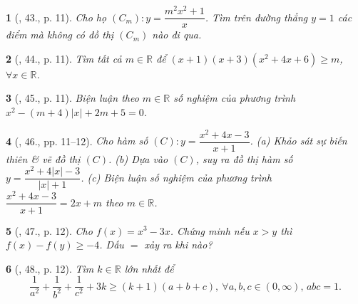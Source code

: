 \documentclass{article}
\newtheorem{baitoan}{}
\begin{document}
\begin{baitoan}[\cite{TLCT_BT_giai_tich_12}, 43., p. 11]
	Cho họ $(C_m):y = \dfrac{m^2x^2 + 1}{x}$. Tìm trên đường thẳng $y = 1$ các điểm mà không có đồ thị $(C_m)$ nào đi qua.
\end{baitoan}

\begin{baitoan}[\cite{TLCT_BT_giai_tich_12}, 44., p. 11]
	Tìm tất cả $m\in\mathbb{R}$ để $(x + 1)(x + 3)(x^2 + 4x + 6)\ge m$, $\forall x\in\mathbb{R}$.
\end{baitoan}

\begin{baitoan}[\cite{TLCT_BT_giai_tich_12}, 45., p. 11]
	Biện luận theo $m\in\mathbb{R}$ số nghiệm của phương trình $x^2 - (m + 4)|x| + 2m + 5 = 0$.
\end{baitoan}

\begin{baitoan}[\cite{TLCT_BT_giai_tich_12}, 46., pp. 11--12]
	Cho hàm số $(C):y = \dfrac{x^2 + 4x - 3}{x + 1}$. (a) Khảo sát sự biến thiên \& vẽ đồ thị $(C)$. (b) Dựa vào $(C)$, suy ra đồ thị hàm số $y = \dfrac{x^2 + 4|x| - 3}{|x| + 1}$. (c) Biện luận số nghiệm của phương trình $\dfrac{x^2 + 4x - 3}{x + 1} = 2x + m$ theo $m\in\mathbb{R}$. 
\end{baitoan}

\begin{baitoan}[\cite{TLCT_BT_giai_tich_12}, 47., p. 12]
	Cho $f(x) = x^3 - 3x$. Chứng minh nếu $x > y$ thì $f(x) - f(y)\ge-4$. Dấu $=$ xảy ra khi nào?
\end{baitoan}

\begin{baitoan}[\cite{TLCT_BT_giai_tich_12}, 48., p. 12]
	Tìm $k\in\mathbb{R}$ lớn nhất để
	\begin{equation}
		\frac{1}{a^2} + \frac{1}{b^2} + \frac{1}{c^2} + 3k\ge(k + 1)(a + b + c),\ \forall a,b,c\in(0,\infty),\,abc = 1.
	\end{equation}
\end{baitoan}


\printbibliography[heading=bibintoc]
	
\end{document}

